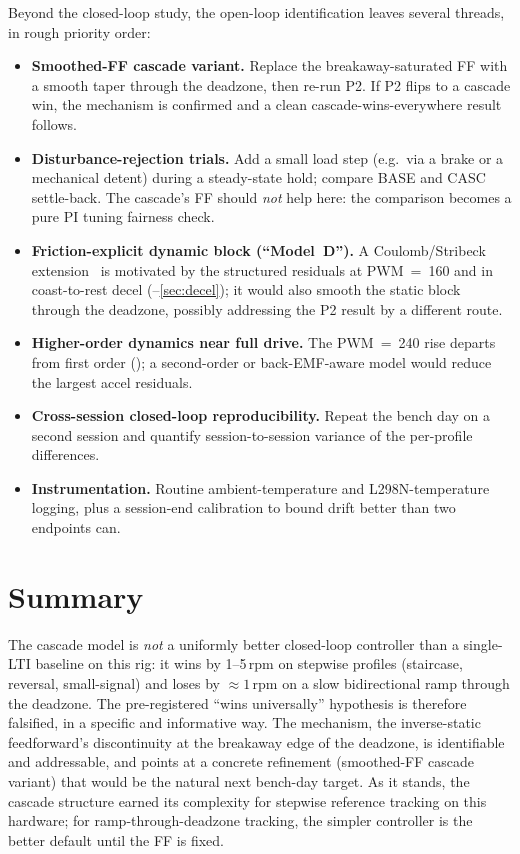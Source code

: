Beyond the closed-loop study, the open-loop identification leaves several threads, in rough priority order:
\begin{itemize}
  \item \textbf{Smoothed-FF cascade variant.} Replace the breakaway-saturated FF with a smooth taper through the deadzone, then re-run P2. If P2 flips to a cascade win, the  mechanism is confirmed and a clean cascade-wins-everywhere result follows.
  \item \textbf{Disturbance-rejection trials.} Add a small load step (e.g.\ via a brake or a mechanical detent) during a steady-state hold; compare BASE and CASC settle-back. The cascade's FF should \emph{not} help here: the comparison becomes a pure PI tuning fairness check.
  \item \textbf{Friction-explicit dynamic block (``Model~D'').} A Coulomb/Stribeck extension~\citep{armstrong1994} is motivated by the structured residuals at PWM~=~160 and in coast-to-rest decel (--\ref{sec:decel}); it would also smooth the static block through the deadzone, possibly addressing the P2 result by a different route.
  \item \textbf{Higher-order dynamics near full drive.} The PWM~=~240 rise departs from first order (); a second-order or back-EMF-aware model would reduce the largest accel residuals.
  \item \textbf{Cross-session closed-loop reproducibility.} Repeat the bench day on a second session and quantify session-to-session variance of the per-profile differences.
  \item \textbf{Instrumentation.} Routine ambient-temperature and L298N-temperature logging, plus a session-end calibration to bound drift better than two endpoints can.
\end{itemize}

\section{Summary}
\label{sec:cl-summary}

The cascade model is \emph{not} a uniformly better closed-loop controller than a single-LTI baseline on this rig: it wins by 1--5\,rpm on stepwise profiles (staircase, reversal, small-signal) and loses by ${\approx}1$\,rpm on a slow bidirectional ramp through the deadzone. The pre-registered ``wins universally'' hypothesis is therefore falsified, in a specific and informative way. The mechanism, the inverse-static feedforward's discontinuity at the breakaway edge of the deadzone, is identifiable and addressable, and points at a concrete refinement (smoothed-FF cascade variant) that would be the natural next bench-day target. As it stands, the cascade structure earned its complexity for stepwise reference tracking on this hardware; for ramp-through-deadzone tracking, the simpler controller is the better default until the FF is fixed.
